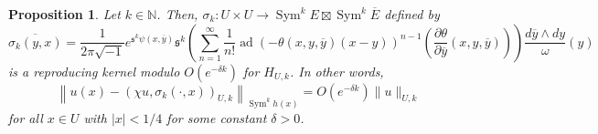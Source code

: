 \documentclass{amsart}
\newtheorem{prop}[thm]{Proposition}
\theoremstyle{definition}
\theoremstyle{remark}
\numberwithin{equation}{section}
\newcommand{\deriv}[2]{\frac{\partial #1}{\partial #2}}
\DeclareMathOperator{\Sym}{Sym}
\DeclareMathOperator{\ad}{ad}
\begin{document}
\begin{prop} \label{prop: local reprod}
Let $k \in \mathbb{N}$. Then, $\sigma_k : U \times U \to \Sym^k E \boxtimes \Sym^k \overline{E}$ defined by
\begin{equation} \label{eq: reprod ker}
\overline{\sigma_k (y,x)} = \frac{1}{2\pi\sqrt{-1}} e^{\mathfrak{s}^k \psi(x,\overline{y})} \mathfrak{s}^k \left (\sum_{n=1}^\infty \frac{1}{n!} \ad(-\theta(x,y,\overline{y})(x-y))^{n-1} \left (\deriv{\theta}{\overline{y}}(x,y,\overline{y}) \right )\right ) \frac{d\overline{y} \wedge dy}{\omega}(y)
\end{equation}
is a reproducing kernel modulo $O(e^{-\delta k})$ for $H_{U,k}$. In other words,
$$
\left \| u(x) - \left ( \chi u, \sigma_k(\cdot, x) \right )_{U,k}  \right \|_{\Sym^k h(x)} =O (e^{-\delta k})\|u\|_{U,k}
$$
for all $x \in U$ with $|x| < 1/4$ for some constant $\delta >0$.
\end{prop}
\end{document}
